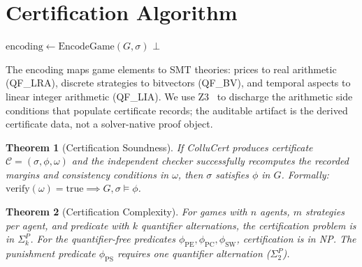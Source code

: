 \documentclass[11pt]{article}
\newtheorem{theorem}{Theorem}
\begin{document}
\section{Certification Algorithm}
\label{sec:algorithm}

\begin{algorithm}[t]
\SetAlgoLined
{}
$\text{encoding} \leftarrow \text{EncodeGame}(G, \sigma)$\;
\Return $\bot$\;
\caption{ColluCert Certification Algorithm}
\end{algorithm}

The encoding maps game elements to SMT theories: prices to real arithmetic (QF\_LRA), discrete strategies to bitvectors (QF\_BV), and temporal aspects to linear integer arithmetic (QF\_LIA). We use Z3~\cite{z3} to discharge the arithmetic side conditions that populate certificate records; the auditable artifact is the derived certificate data, not a solver-native proof object.

\begin{theorem}[Certification Soundness]
\label{thm:soundness}
If ColluCert produces certificate $\mathcal{C} = (\sigma, \phi, \omega)$ and the independent checker successfully recomputes the recorded margins and consistency conditions in $\omega$, then $\sigma$ satisfies $\phi$ in $G$. Formally: $\text{verify}(\omega) = \text{true} \implies G, \sigma \models \phi$.
\end{theorem}

\begin{theorem}[Certification Complexity]
\label{thm:complexity}
For games with $n$ agents, $m$ strategies per agent, and predicate with $k$ quantifier alternations, the certification problem is in $\Sigma_k^P$. For the quantifier-free predicates $\phi_{\text{PE}}, \phi_{\text{PC}}, \phi_{\text{SW}}$, certification is in NP. The punishment predicate $\phi_{\text{PS}}$ requires one quantifier alternation ($\Sigma_2^P$).
\end{theorem}
\end{document}

